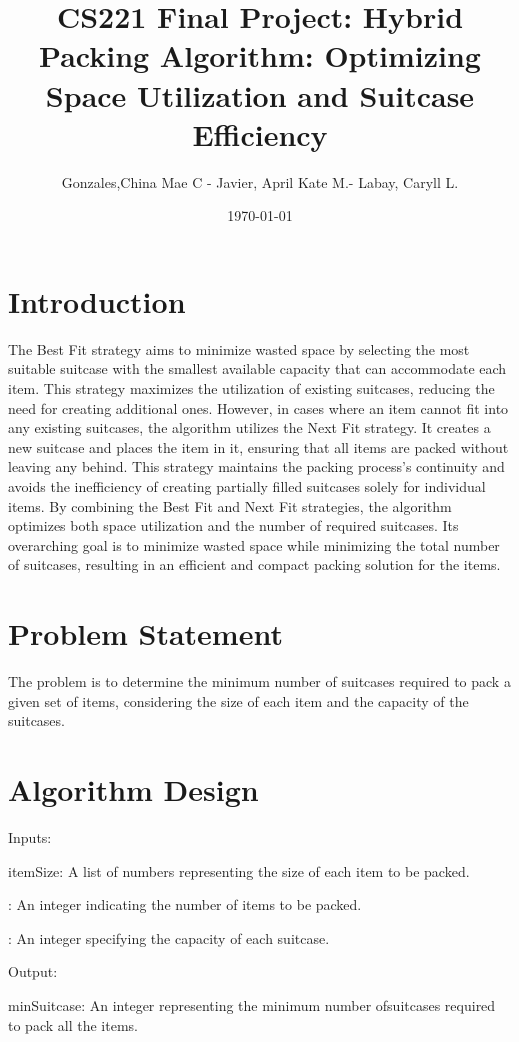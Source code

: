 \documentclass[12pt]{article}
\title{CS221 Final Project: Hybrid Packing Algorithm: Optimizing Space Utilization and Suitcase Efficiency
}
\author{Gonzales,China Mae C -  Javier, April Kate M.- Labay, Caryll L.}
\date{\today}
\begin{document}
\maketitle  

\section{Introduction}

The Best Fit strategy aims to minimize wasted space by selecting the most suitable suitcase with the smallest available capacity that can accommodate each item. This strategy maximizes the utilization of existing suitcases, reducing the need for creating additional ones. However, in cases where an item cannot fit into any existing suitcases, the algorithm utilizes the Next Fit strategy. It creates a new suitcase and places the item in it, ensuring that all items are packed without leaving any behind. This strategy maintains the packing process's continuity and avoids the inefficiency of creating partially filled suitcases solely for individual items. By combining the Best Fit and Next Fit strategies, the algorithm optimizes both space utilization and the number of required suitcases. Its overarching goal is to minimize wasted space while minimizing the total number of suitcases, resulting in an efficient and compact packing solution for the items.

\section{Problem Statement}
The problem is to determine the minimum number of suitcases required to pack a given set of items, considering the size of each item and the capacity of the suitcases.



\section{Algorithm Design}
\noindent Inputs: 

\noindent itemSize: A list of numbers representing the size of each item to be packed.

\noindent: An integer indicating the number of items to be packed.

\noindent: An integer specifying the capacity of each suitcase.

\vspace{0.3cm}
\noindent Output:

\noindent minSuitcase: An integer representing the minimum number ofsuitcases required to pack all the 
items.
\end{document}
